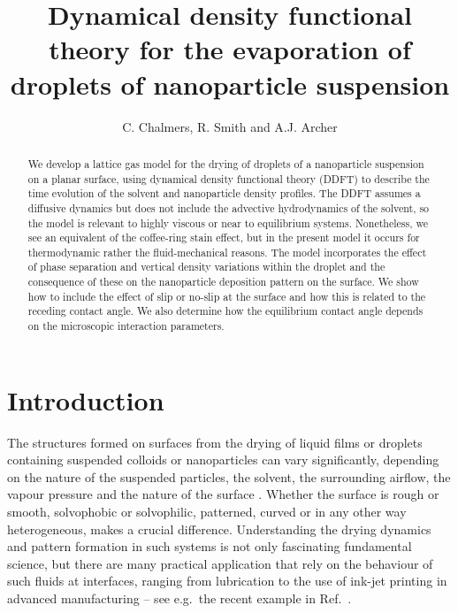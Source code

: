 \documentclass[journal=langd5,manuscript=article]{achemso}
\author{C. Chalmers, R. Smith and A.J. Archer}
\affiliation{Department of Mathematical Sciences, Loughborough University, Loughborough LE11 3TU, UK}
\title[Dynamical density functional theory for the evaporation of droplets
  of nanoparticle suspension]
  {Dynamical density functional theory for the evaporation of droplets
  of nanoparticle suspension}
\begin{document}
\begin{abstract}

We develop a lattice gas model for the drying of droplets of a nanoparticle suspension on a planar surface, using dynamical density functional theory (DDFT) to describe the time evolution of the solvent and nanoparticle density profiles. The DDFT assumes a diffusive dynamics but does not include the advective hydrodynamics of the solvent, so the model is relevant to highly viscous or near to equilibrium systems. Nonetheless, we see an equivalent of the coffee-ring stain effect, but in the present model it occurs for thermodynamic rather the fluid-mechanical reasons. The model incorporates the effect of phase separation and vertical density variations within the droplet and the consequence of these on the nanoparticle deposition pattern on the surface. We show how to include the effect of slip or no-slip at the surface and how this is related to the receding contact angle. We also determine how the equilibrium contact angle depends on the microscopic interaction parameters.

\end{abstract}

\section{Introduction}\label{introduction}

The structures formed on surfaces from the drying of liquid films or droplets containing suspended colloids or nanoparticles can vary significantly, depending on the nature of the suspended particles, the solvent, the surrounding airflow, the vapour pressure and the nature of the surface \cite{blunt2010patterns, han2012learning, routh2013drying, thiele2014patterned}. Whether the surface is rough or smooth, solvophobic or solvophilic, patterned, curved or in any other way heterogeneous, makes a crucial difference. Understanding the drying dynamics and pattern formation in such systems is not only fascinating fundamental science, but there are many practical application that rely on the behaviour of such fluids at interfaces, ranging from lubrication to the use of ink-jet printing in advanced manufacturing -- see e.g.\ the recent example in Ref.~.
\end{document}
